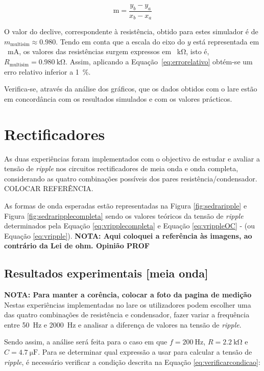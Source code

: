 \begin{equation} \label{eq:declive}
	\text{m} = \frac{y_{b} - y_{a}}{x_{b} - x_{a}}
\end{equation}

O valor do declive, correspondente à resistência, obtido para estes simulador é de $m_\text{{multisim}} \approx{0.980}$. Tendo em conta que a escala do eixo do $y$ está representada em \SI{}{\milli\ampere}, os valores das resistências surgem expressos em \SI{}{\kilo\ohm}, isto é, $R_\text{{multisim}} = \SI{0.980}{\kilo\ohm}$. Assim, aplicando a Equação~\ref{eq:errorelativo} obtém-se um erro relativo inferior a \SI{1}{\percent}.

Verifica-se, através da análise dos gráficos, que os dados obtidos com o \acrshort{lare} estão em concordância com os resultados simulados e com os valores prácticos.

\section{Rectificadores}
\label{sec:resultados_rectificadores}
As duas experiências foram implementados com o objectivo de estudar e avaliar a tensão de \textit{ripple} nos circuitos rectificadores de meia onda e onda completa, considerando as quatro combinações possíveis dos pares resistência/condensador. COLOCAR REFERÊNCIA.

As formas de onda esperadas estão representadas na Figura \ref{fig:sedraripple} e Figura \ref{fig:sedraripplecompleta} sendo os valores teóricos da tensão de \textit{ripple} determinados pela Equação \ref{eq:vripplecompleta} e Equação \ref{eq:vrippleOC} - (ou Equação \ref{eq:vripple}). \textbf{NOTA: Aqui coloquei a referência às imagens, ao contrário da Lei de ohm. Opinião PROF}
\subsection{Resultados experimentais [meia onda]}
\label{sec:resultados_RectificadoresMeiaOnda}
\textbf{NOTA: Para manter a corência, colocar a foto da pagina de medição}	
Nestas experiências implementadas no \acrshort{lare} os utilizadores podem escolher uma das quatro combinações de resistência e condensador, fazer variar a frequência entre \SI{50}{\hertz} e \SI{2000}{\hertz} e analisar a diferença de valores na tensão de \textit{ripple}.

Sendo assim, a análise será feita para o caso em que $f=\SI{200}{\hertz}$, $R=\SI{2.2}{\kilo\ohm}$ e $C=\SI{4.7}{\micro\farad}$. Para se determinar qual expressão a usar para calcular a tensão de \textit{ripple}, é necessário verificar a condição descrita na Equação \ref{eq:verificarcondicao}:

